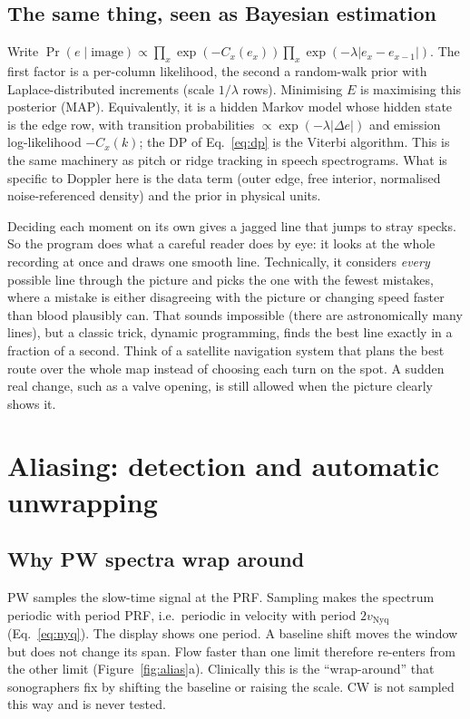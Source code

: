 \documentclass[11pt,a4paper]{article}
\newcommand{\vnyq}{v_{\mathrm{Nyq}}}
\begin{document}
\subsection{The same thing, seen as Bayesian estimation}
\label{sec:bayes}
Write $\Pr(e \mid \text{image}) \propto \prod_x \exp(-C_x(e_x)) \prod_x \exp(-\lambda|e_x - e_{x-1}|)$. The first factor is a
per-column likelihood, the second a random-walk prior with Laplace-distributed increments (scale $1/\lambda$ rows).
Minimising $E$ is maximising this posterior (MAP). Equivalently, it is a hidden Markov model whose hidden state is the
edge row, with transition probabilities $\propto \exp(-\lambda|\Delta e|)$ and emission log-likelihood $-C_x(k)$; the
DP of Eq.~\eqref{eq:dp} is the Viterbi algorithm. This is the same machinery as pitch or ridge tracking in speech
spectrograms. What is specific to Doppler here is the data term (outer edge, free interior, normalised
noise-referenced density) and the prior in physical units.

\begin{plainbox}
Deciding each moment on its own gives a jagged line that jumps to stray specks. So the program does what a careful
reader does by eye: it looks at the whole recording at once and draws one smooth line. Technically, it considers
\emph{every} possible line through the picture and picks the one with the fewest mistakes, where a mistake is
either disagreeing with the picture or changing speed faster than blood plausibly can. That sounds impossible
(there are astronomically many lines), but a classic trick, dynamic programming, finds the best line exactly in a
fraction of a second. Think of a satellite navigation system that plans the best route over the whole map instead of
choosing each turn on the spot. A sudden real change, such as a valve opening, is still allowed when the picture
clearly shows it.
\end{plainbox}

\section{Aliasing: detection and automatic unwrapping}
\label{sec:alias}

\subsection{Why PW spectra wrap around}
PW samples the slow-time signal at the PRF. Sampling makes the spectrum periodic with period PRF, i.e.\ periodic in
velocity with period $2\vnyq$ (Eq.~\eqref{eq:nyq}). The display shows one period. A baseline shift moves the window
but does not change its span. Flow faster than one limit therefore re-enters from the other limit
(Figure~\ref{fig:alias}a). Clinically this is the ``wrap-around'' that sonographers fix by shifting the baseline or
raising the scale. CW is not sampled this way and is never tested.
\end{document}
